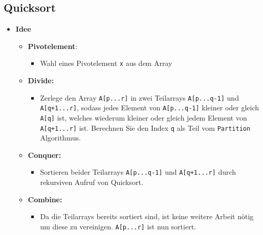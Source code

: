 \subsection{Quicksort}
    \begin{itemize}
        \item \textbf{Idee}
            \begin{itemize}
                \item \textbf{Pivotelement}:
                    \begin{itemize}
                        \item[]
                            Wahl eines Pivotelement \texttt{x} aus dem Array
                    \end{itemize}

                \item \textbf{Divide:}
                    \begin{itemize}
                        \item[]
                            Zerlege den Array \texttt{A[p...r]} in zwei Teilarrays \texttt{A[p...q-1]} und \texttt{A[q+1...r]},
                            sodass jedes Element von \texttt{A[p...q-1]} kleiner oder gleich \texttt{A[q]} ist, welches
                            wiederum kleiner oder gleich jedem Element von \texttt{A[q+1...r]} ist. Berechnen Sie den Index \texttt{q}
                            als Teil vom \texttt{Partition} Algorithmus.
                    \end{itemize}

                \item \textbf{Conquer:}
                    \begin{itemize}
                        \item[]
                            Sortieren beider Teilarrays \texttt{A[p...q-1]} und \texttt{A[q+1...r]} durch rekursiven Aufruf von
                            Quicksort.
                    \end{itemize}
                
                \item \textbf{Combine:}
                    \begin{itemize}
                        \item[]
                            Da die Teilarrays bereits sortiert sind, ist keine weitere Arbeit nötig um diese zu vereinigen.
                            \texttt{A[p...r]} ist nun sortiert.
                    \end{itemize}
            \end{itemize}


\end{itemize}
